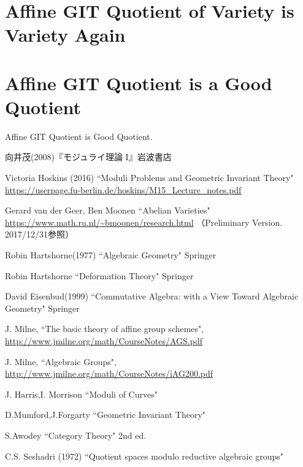 \documentclass[a4paper]{jsarticle}
\begin{document}
\section{Affine GIT Quotient of Variety is Variety Again }

\section{Affine GIT Quotient is a Good Quotient}
    \begin{Thm}\label{thm:git=good}
        Affine GIT Quotient is Good Quotient.
    \end{Thm}

\begin{thebibliography}{99}
    向井茂(2008)『モジュライ理論 I』岩波書店
    
    Victoria Hoskins (2016)
    ``Moduli Problems and Geometric Invariant Theory"
    \url{https://userpage.fu-berlin.de/hoskins/M15_Lecture_notes.pdf}

    Gerard van der Geer, Ben Moonen
    ``Abelian Varieties"
    \url{https://www.math.ru.nl/~bmoonen/research.html}
    （Preliminary Version. 2017/12/31参照）

    Robin Hartshorne(1977)
    ``Algebraic Geometry"
    Springer

    Robin Hartshorne
    ``Deformation Theory"
    Springer

    David Eisenbud(1999)
    ``Commutative Algebra: with a View Toward Algebraic Geometry"
    Springer
    
    J. Milne, ``The basic theory of affine group schemes", 
    \url{http://www.jmilne.org/math/CourseNotes/AGS.pdf}
    
    J. Milne, ``Algebraic Groups", 
    \url{http://www.jmilne.org/math/CourseNotes/iAG200.pdf}

    J. Harris,I. Morrison ``Moduli of Curves"

    D.Mumford,J.Forgarty ``Geometric Invariant Theory"

    S.Awodey ``Category Theory" 2nd ed.

    C.S. Seshadri (1972)
    ``Quotient spaces modulo reductive algebraic groups"

\end{thebibliography}
\end{document}
